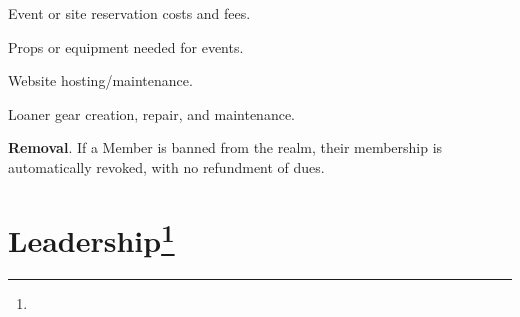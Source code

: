\documentclass[12pt]{article}
\newcommand{\newpart}[2][]{\colorbox{green!40}{#2}\expandafter\ifx\expandafter\relax\detokenize{#1}\relax\else\textnormal{\footnote{#1}}\fi}
\begin{document}
\begin{level}
    \begin{level}
        \item Event or site reservation costs and fees.
        \item Props or equipment needed for events.
        \item Website hosting/maintenance.
        \item Loaner gear creation, repair, and maintenance.
    \end{level}
    \item \textbf{Removal}. If a Member is banned from the realm, their membership is automatically revoked, with no refundment of dues.
\end{level}

\section{\newpart{Leadership}}
\end{document}
